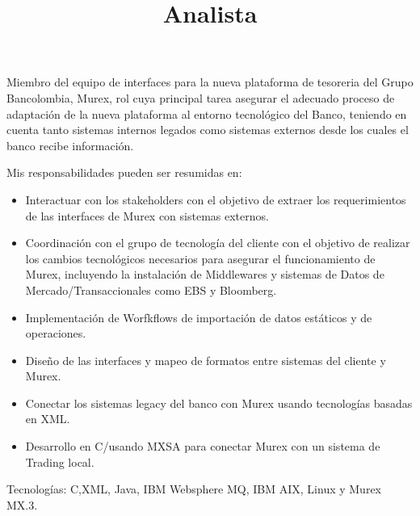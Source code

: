 \begin{resume}
\title{\textbf{Analista} }
\begin{position}
Miembro del equipo de interfaces para la nueva plataforma de tesoreria  del
Grupo Bancolombia, Murex, rol cuya principal tarea asegurar el adecuado proceso de adaptaci\'{o}n de la nueva plataforma al entorno tecnol\'{o}gico del Banco, teniendo en cuenta tanto sistemas internos legados como sistemas externos desde los  cuales el banco recibe informaci\'{o}n.

Mis responsabilidades pueden ser resumidas en:

\begin{itemize}
\item {Interactuar con los stakeholders con el objetivo de extraer los requerimientos de las interfaces de Murex con sistemas externos.}
\item {Coordinaci\'{o}n con el grupo de tecnolog\'{i}a del cliente  con el objetivo de realizar los cambios tecnol\'{o}gicos necesarios para asegurar el  funcionamiento de Murex, incluyendo la instalaci\'{o}n de Middlewares y sistemas de Datos de Mercado/Transaccionales como EBS y Bloomberg.}
\item {Implementaci\'{o}n de Worfkflows de importaci\'{o}n de datos est\'{a}ticos y de operaciones.}
\item {Dise\~{n}o de las interfaces y mapeo de formatos entre sistemas del cliente  y Murex.}
\item {Conectar los sistemas legacy del banco con Murex usando tecnolog\'{i}as basadas en XML.}
\item {Desarrollo en C/\CSharp usando MXSA para conectar Murex con un sistema de Trading local.}
\end{itemize}

Tecnolog\'{i}as: C,XML, Java, IBM  Websphere MQ, IBM AIX, Linux y Murex MX.3.
\end{position}


\end{resume}
